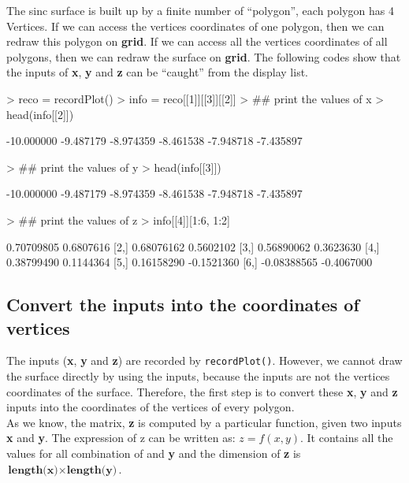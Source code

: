 \documentclass[11pt,twoside]{report}
\begin{document}
\newpage
The sinc surface is built up by a finite number of ``polygon'', each polygon has 4 Vertices. If we can access the vertices coordinates of one polygon, then we can redraw this polygon on \textbf{grid}. If we can access all the vertices coordinates of all polygons, then we can redraw the surface on \textbf{grid}. The following codes show that the inputs of \textbf{x}, \textbf{y} and \textbf{z} can be ``caught'' from the display list.
\begin{Schunk}
\begin{Sinput}
> reco = recordPlot()
> info = reco[[1]][[3]][[2]]
> ## print the values of x
> head(info[[2]])
\end{Sinput}
\begin{Soutput}
[1] -10.000000  -9.487179  -8.974359  -8.461538  -7.948718  -7.435897
\end{Soutput}
\begin{Sinput}
> ## print the values of y
> head(info[[3]])
\end{Sinput}
\begin{Soutput}
[1] -10.000000  -9.487179  -8.974359  -8.461538  -7.948718  -7.435897
\end{Soutput}
\begin{Sinput}
> ## print the values of z
> info[[4]][1:6, 1:2]
\end{Sinput}
\begin{Soutput}
            [,1]       [,2]
[1,]  0.70709805  0.6807616
[2,]  0.68076162  0.5602102
[3,]  0.56890062  0.3623630
[4,]  0.38799490  0.1144364
[5,]  0.16158290 -0.1521360
[6,] -0.08388565 -0.4067000
\end{Soutput}
\end{Schunk}
\subsection{Convert the inputs into the coordinates of vertices}
The inputs (\textbf{x}, \textbf{y} and \textbf{z}) are recorded by \texttt{recordPlot()}. However, we cannot draw the surface directly by using the inputs, because the inputs are not the vertices coordinates of the surface. Therefore, the first step is to convert these \textbf{x}, \textbf{y} and \textbf{z} inputs into the coordinates of the vertices of every polygon.\\

As we know, the matrix, \textbf{z} is computed by a particular function, given two inputs \textbf{x} and \textbf{y}. The expression of z can be written as: $z = f(x,y)$. It contains all the values for all combination of  and \textbf{y} and the dimension of \textbf{z} is $ \textbf{length(x)} \times \textbf{length(y)}$.\\
\end{document}
